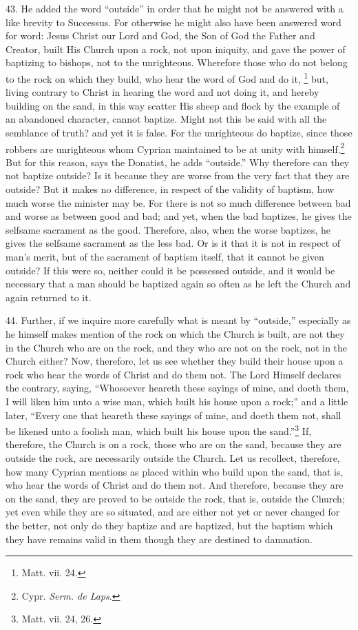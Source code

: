 43. He added the word ``outside'' in order that he might not be answered with a like brevity to Successus. For otherwise he might also have been answered word for word: Jesus Christ our Lord and God, the Son of God the Father and Creator, built His Church upon a rock, not upon iniquity, and gave the power of baptizing to bishops, not to the unrighteous. Wherefore those who do not belong to the rock on which they build, who hear the word of God and do it, \footnote{\par  Matt. vii. 24.} but, living contrary to Christ in hearing the word and not doing it, and hereby building on the sand, in this way scatter His sheep and flock by the example of an abandoned character, cannot baptize. Might not this be said with all the semblance of truth? and yet it is false. For the unrighteous do baptize, since those robbers are unrighteous whom Cyprian maintained to be at unity with himself.\footnote{\par  Cypr. \emph{Serm. de Laps}.} But for this reason, says the Donatist, he adds ``outside.'' Why therefore can they not baptize outside? Is it because they are worse from the very fact that they are outside? But it makes no difference, in respect of the validity of baptism, how much worse the minister may be. For there is not so much difference between bad and worse as between good and bad; and yet, when the bad baptizes, he gives the selfsame sacrament as the good. Therefore, also, when the worse baptizes, he gives the selfsame sacrament as the less bad. Or is it that it is not in respect of man’s merit, but of the sacrament of baptism itself, that it cannot be given outside? If this were so, neither could it be possessed outside, and it would be necessary that a man should be baptized again so often as he left the Church and again returned to it.

44. Further, if we inquire more carefully what is meant by ``outside,'' especially as he himself makes mention of the rock on which the Church is built, are not they in the Church who are on the rock, and they who are not on the rock, not in the Church either? Now, therefore, let us see whether they build their house upon a rock who hear the words of Christ and do them not. The Lord Himself declares the contrary, saying, ``Whosoever heareth these sayings of mine, and doeth them, I will liken him unto a wise man, which built his house upon a rock;'' and a little later, ``Every one that heareth these sayings of mine, and doeth them not, shall be likened unto a foolish man, which built his house upon the sand.''\footnote{\par  Matt. vii. 24, 26.} If, therefore, the Church is on a rock, those who are on the sand, because they are outside the rock, are necessarily outside the Church. Let us recollect, therefore, how many Cyprian mentions as placed within who build upon the sand, that is, who hear the words of Christ and do them not. And therefore, because they are on the sand, they are proved to be outside the rock, that is, outside the Church; yet even while they are so situated, and are either not yet or never changed for the better, not only do they baptize and are baptized, but the baptism which they have remains valid in them though they are destined to damnation.

